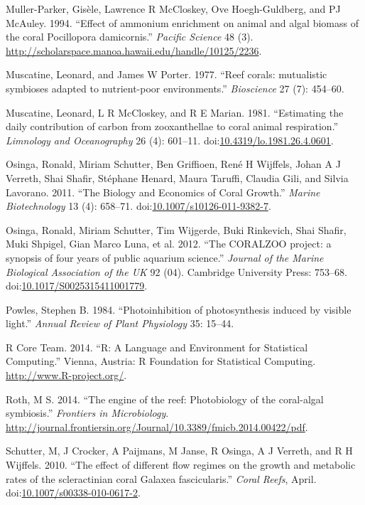 \documentclass[]{elsarticle} %
\begin{document}
\hypertarget{ref-MullerParker:1994uo}{}
Muller-Parker, Gisèle, Lawrence R McCloskey, Ove Hoegh-Guldberg, and PJ
McAuley. 1994. ``Effect of ammonium enrichment on animal and algal
biomass of the coral Pocillopora damicornis.'' \emph{Pacific Science} 48
(3). \url{http://scholarspace.manoa.hawaii.edu/handle/10125/2236}.

\hypertarget{ref-Muscatine:1977p4220}{}
Muscatine, Leonard, and James W Porter. 1977. ``Reef corals: mutualistic
symbioses adapted to nutrient-poor environments.'' \emph{Bioscience} 27
(7): 454--60.

\hypertarget{ref-Muscatine:1981jy}{}
Muscatine, Leonard, L R McCloskey, and R E Marian. 1981. ``Estimating
the daily contribution of carbon from zooxanthellae to coral animal
respiration.'' \emph{Limnology and Oceanography} 26 (4): 601--11.
doi:\href{https://doi.org/10.4319/lo.1981.26.4.0601}{10.4319/lo.1981.26.4.0601}.

\hypertarget{ref-Osinga:2011kq}{}
Osinga, Ronald, Miriam Schutter, Ben Griffioen, René H Wijffels, Johan A
J Verreth, Shai Shafir, Stéphane Henard, Maura Taruffi, Claudia Gili,
and Silvia Lavorano. 2011. ``The Biology and Economics of Coral
Growth.'' \emph{Marine Biotechnology} 13 (4): 658--71.
doi:\href{https://doi.org/10.1007/s10126-011-9382-7}{10.1007/s10126-011-9382-7}.

\hypertarget{ref-Osinga:2012is}{}
Osinga, Ronald, Miriam Schutter, Tim Wijgerde, Buki Rinkevich, Shai
Shafir, Muki Shpigel, Gian Marco Luna, et al. 2012. ``The CORALZOO
project: a synopsis of four years of public aquarium science.''
\emph{Journal of the Marine Biological Association of the UK} 92 (04).
Cambridge University Press: 753--68.
doi:\href{https://doi.org/10.1017/S0025315411001779}{10.1017/S0025315411001779}.

\hypertarget{ref-Powles:1984tm}{}
Powles, Stephen B. 1984. ``Photoinhibition of photosynthesis induced by
visible light.'' \emph{Annual Review of Plant Physiology} 35: 15--44.

\hypertarget{ref-RALanguageandEn:2014wf}{}
R Core Team. 2014. ``R: A Language and Environment for Statistical
Computing.'' Vienna, Austria: R Foundation for Statistical Computing.
\url{http://www.R-project.org/}.

\hypertarget{ref-Roth:2014wf}{}
Roth, M S. 2014. ``The engine of the reef: Photobiology of the
coral-algal symbiosis.'' \emph{Frontiers in Microbiology}.
\url{http://journal.frontiersin.org/Journal/10.3389/fmicb.2014.00422/pdf}.

\hypertarget{ref-Schutter:2010p7758}{}
Schutter, M, J Crocker, A Paijmans, M Janse, R Osinga, A J Verreth, and
R H Wijffels. 2010. ``The effect of different flow regimes on the growth
and metabolic rates of the scleractinian coral Galaxea fascicularis.''
\emph{Coral Reefs}, April.
doi:\href{https://doi.org/10.1007/s00338-010-0617-2}{10.1007/s00338-010-0617-2}.
\end{document}
